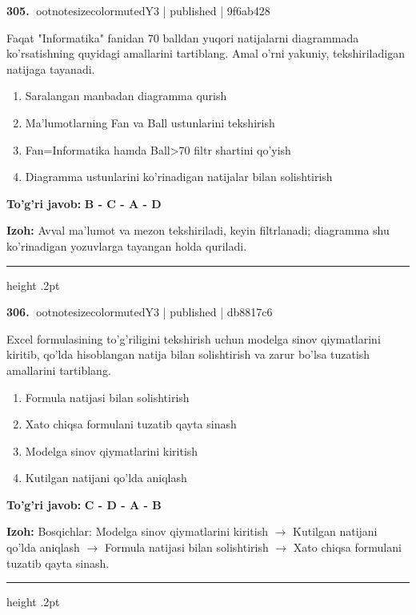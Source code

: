 \documentclass[10pt,a4paper]{article}
\begin{document}
\textbf{\color{ink}305.} {ootnotesizecolor{muted}Y3 | published | 9f6ab428}
\par
Faqat "Informatika" fanidan 70 balldan yuqori natijalarni diagrammada ko'rsatishning quyidagi amallarini tartiblang. Amal o'rni yakuniy, tekshiriladigan natijaga tayanadi.
\begin{enumerate}[label=\Alph*),leftmargin=9mm]
\item Saralangan manbadan diagramma qurish
\item Ma'lumotlarning Fan va Ball ustunlarini tekshirish
\item Fan=Informatika hamda Ball\textgreater{}70 filtr shartini qo'yish
\item Diagramma ustunlarini ko'rinadigan natijalar bilan solishtirish
\end{enumerate}
\begin{tcolorbox}[enhanced,breakable,colback=teal!4,colframe=teal!55!black,boxrule=0.45pt,arc=1.2mm,left=2.8mm,right=2.8mm,top=2mm,bottom=2mm]
\textbf{\color{teal}To'g'ri javob:} \textbf{B - C - A - D}
\par\smallskip
\textbf{Izoh:} Avval ma'lumot va mezon tekshiriladi, keyin filtrlanadi; diagramma shu ko'rinadigan yozuvlarga tayangan holda quriladi.
\end{tcolorbox}
\vspace{2mm}\hrule height .2pt\vspace{2mm}

\textbf{\color{ink}306.} {ootnotesizecolor{muted}Y3 | published | db8817c6}
\par
Excel formulasining to'g'riligini tekshirish uchun modelga sinov qiymatlarini kiritib, qo'lda hisoblangan natija bilan solishtirish va zarur bo'lsa tuzatish amallarini tartiblang.
\begin{enumerate}[label=\Alph*),leftmargin=9mm]
\item Formula natijasi bilan solishtirish
\item Xato chiqsa formulani tuzatib qayta sinash
\item Modelga sinov qiymatlarini kiritish
\item Kutilgan natijani qo'lda aniqlash
\end{enumerate}
\begin{tcolorbox}[enhanced,breakable,colback=teal!4,colframe=teal!55!black,boxrule=0.45pt,arc=1.2mm,left=2.8mm,right=2.8mm,top=2mm,bottom=2mm]
\textbf{\color{teal}To'g'ri javob:} \textbf{C - D - A - B}
\par\smallskip
\textbf{Izoh:} Bosqichlar: Modelga sinov qiymatlarini kiritish \ensuremath{\rightarrow} Kutilgan natijani qo'lda aniqlash \ensuremath{\rightarrow} Formula natijasi bilan solishtirish \ensuremath{\rightarrow} Xato chiqsa formulani tuzatib qayta sinash.
\end{tcolorbox}
\vspace{2mm}\hrule height .2pt\vspace{2mm}
\end{document}
